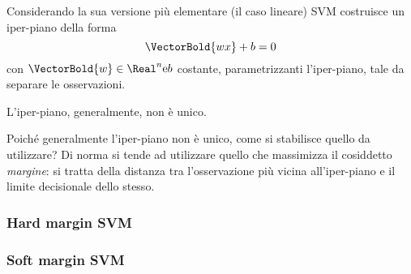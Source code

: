 \documentclass{subfiles}
\begin{document}
Considerando la sua versione più elementare (il caso lineare) SVM costruisce un iper-piano della forma
$$
    \VectorBold{wx} + b = 0
$$
con $\VectorBold{w} \in \Real^{n} \text{e} b$ costante, parametrizzanti l'iper-piano,
tale da separare le osservazioni.

\begin{Remark*}
    L'iper-piano, generalmente, non è unico.
\end{Remark*}

Poiché generalmente l'iper-piano non è unico, come si stabilisce quello da utilizzare?
Di norma si tende ad utilizzare quello che massimizza il cosiddetto \emph{margine}:
si tratta della distanza tra l'osservazione più vicina all'iper-piano e il limite decisionale dello stesso.

\subsubsection{Hard margin SVM}


\subsubsection{Soft margin SVM}

\end{document}
